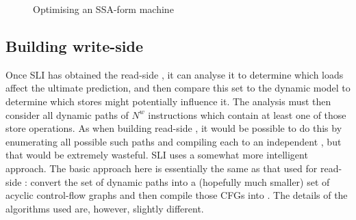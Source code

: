 \begin{figure}
\caption{Optimising an SSA-form machine}
\label{fig:ssa_cfg1}
\end{figure}


\subsection{Building write-side \StateMachines}

Once SLI has obtained the read-side \StateMachine, it can analyse it to determine which loads affect the ultimate prediction, and then compare this set to the dynamic model to determine which stores might potentially influence it.
The analysis must then consider all dynamic paths of $N^w$ instructions which contain at least one of those store operations.
As when building read-side \StateMachines, it would be possible to do this by enumerating all possible such paths and compiling each to an independent \StateMachine, but that would be extremely wasteful.
SLI uses a somewhat more intelligent approach.
The basic approach here is essentially the same as that used for read-side \StateMachines: convert the set of dynamic paths into a (hopefully much smaller) set of acyclic control-flow graphs and then compile those CFGs into \StateMachines.
The details of the algorithms used are, however, slightly different.

